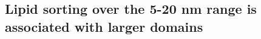 %
%
%	
%
%

	\subsection{Lipid sorting over the 5-20 nm range is associated with larger domains  } \label{Sorting}

